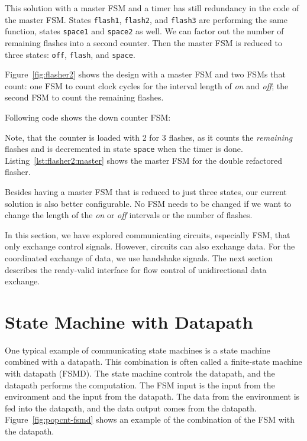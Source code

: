 \documentclass[%
    10pt,
    headinclude, footexclude,
    openright, %
    notitlepage,
    cleardoubleempty,
    headsepline,
    pointlessnumbers,
    bibtotoc, idxtotoc,
    ]{scrbook}
\newcommand{\code}[1]{{\small{\texttt{#1}}}}
\begin{document}
This solution with a master FSM and a timer has still redundancy in the code
of the master FSM. States \code{flash1}, \code{flash2}, and \code{flash3}
are performing the same function, states \code{space1} and \code{space2} as well.
We can factor out the number of remaining flashes into a second counter.
Then the master FSM is reduced to three states: \code{off}, \code{flash},
and \code{space}.

Figure~\ref{fig:flasher2} shows the design with a master FSM and two FSMs
that count: one FSM to count clock cycles for the interval length of \emph{on}
and \emph{off}; the second FSM to count the remaining flashes.

Following code shows the down counter FSM:


\noindent Note, that the counter is loaded with 2 for 3 flashes, as it counts the
\emph{remaining} flashes and is decremented in state \code{space} when the timer
is done. Listing~\ref{lst:flasher2:master} shows the master FSM for the double refactored flasher.


Besides having a master FSM that is reduced to just three states, our current solution
is also better configurable. No FSM needs to be changed if we want to change
the length of the \emph{on} or \emph{off} intervals or the number of flashes.

In this section, we have explored communicating circuits, especially FSM, that
only exchange control signals. However, circuits can also exchange data.
For the coordinated exchange of data, we use handshake signals.
The next section describes the ready-valid interface for flow control of
unidirectional data exchange.

\section{State Machine with Datapath}

One typical example of communicating state machines is a state machine
combined with a datapath. This combination is often called a finite-state machine
with datapath (FSMD). The state machine controls the datapath, and the datapath
performs the computation. The FSM input is the input from the environment and the input
from the datapath. The data from the environment is fed into the datapath, and the
data output comes from the datapath. Figure~\ref{fig:popcnt-fsmd} shows an example
of the combination of the FSM with the datapath.
\end{document}
